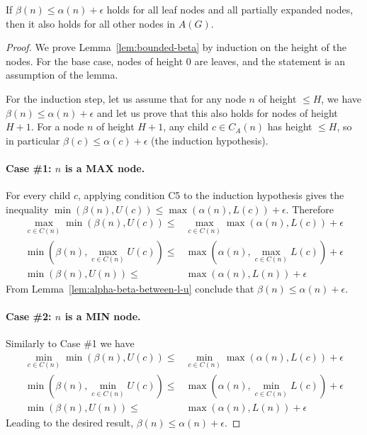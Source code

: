 \documentclass[runningheads]{llncs}
\newcommand{\pess}{\mathit{L}}
\newcommand{\opti}{\mathit{U}}
\begin{document}
\begin{lemma}
If $\beta(n)\leq \alpha(n)+\epsilon$ holds for all leaf nodes and all partially expanded nodes, then it also holds for all other nodes in $A(G)$. 
\label{lem:bounded-beta}
\end{lemma}
\begin{proof}
We prove Lemma~\ref{lem:bounded-beta} by induction on the height of the nodes.
For the base case, nodes of height 0 are leaves, and the statement is an assumption of the lemma.

For the induction step, let us assume that for any node $n$ of height $\leq H$, we have $\beta(n)\leq \alpha(n)+\epsilon$ and let us prove that this also holds for nodes of height $H+1$.
For a node $n$ of height $H+1$, any child $c \in C_A(n)$ has height $\leq H$, so in particular $\beta(c)\leq \alpha(c)+\epsilon$ (the induction hypothesis).

\paragraph{Case \#1: $n$ is a MAX node.}
For every child $c$, applying condition C5 to the induction hypothesis gives the inequality
$\min(\beta(n), \opti(c)) \leq \max(\alpha(n), \pess(c))+\epsilon$.
Therefore 
\begin{align}
\!\!\max_{c \in C(n)} \!\!\min(\beta(n), \opti(c)) \leq & \!\!\max_{c \in C(n)} \!\!\max(\alpha(n), \pess(c))+\epsilon\\
\!\!\min(\beta(n), \!\!\max_{c \in C(n)}\!\!\opti(c)) \leq & \max(\alpha(n), \!\!\max_{c \in C(n)}\!\!\pess(c))+\epsilon\\
\!\!\min(\beta(n), \opti(n)) \leq & \max(\alpha(n), \pess(n))+\epsilon
\end{align}
From Lemma~\ref{lem:alpha-beta-between-l-u} conclude that $\beta(n) \leq \alpha(n) + \epsilon$.

\paragraph{Case \#2: $n$ is a MIN node.}
Similarly to Case \#1 we have 
\begin{align}
\!\!\min_{c \in C(n)} \!\!\min(\beta(n), \opti(c)) \leq & \!\!\min_{c \in C(n)} \!\!\max(\alpha(n), \pess(c))+\epsilon\\
\!\!\min(\beta(n), \!\!\min_{c \in C(n)}\!\!\opti(c)) \leq & \max(\alpha(n), \!\!\min_{c \in C(n)}\!\!\pess(c))+\epsilon\\
\!\!\min(\beta(n), \opti(n)) \leq & \max(\alpha(n), \pess(n))+\epsilon
\end{align}
Leading to the desired result, $\beta(n) \leq \alpha(n) + \epsilon$.


\end{proof}
\end{document}
